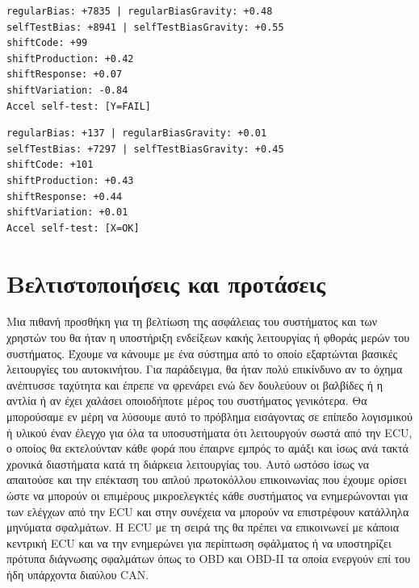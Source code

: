 \documentclass{article}
\begin{document}
\begin{lstlisting}[frame=single,caption=Αποτυχημένο self-test για τον Y άξονα,label=code1]
regularBias: +7835 | regularBiasGravity: +0.48
selfTestBias: +8941 | selfTestBiasGravity: +0.55
shiftCode: +99 
shiftProduction: +0.42
shiftResponse: +0.07
shiftVariation: -0.84
Accel self-test: [Y=FAIL]
\end{lstlisting}

\begin{lstlisting}[frame=single,caption=Επιτυχημένο self-test για τον X άξονα,label=code2]
regularBias: +137 | regularBiasGravity: +0.01
selfTestBias: +7297 | selfTestBiasGravity: +0.45
shiftCode: +101
shiftProduction: +0.43
shiftResponse: +0.44
shiftVariation: +0.01
Accel self-test: [X=OK]
\end{lstlisting}

\section{Βελτιστοποιήσεις και προτάσεις}

Μια πιθανή προσθήκη για τη βελτίωση της ασφάλειας του συστήματος και των χρηστών του θα ήταν η υποστήριξη ενδείξεων κακής λειτουργίας ή φθοράς μερών του συστήματος. Έχουμε να κάνουμε με ένα σύστημα από το οποίο εξαρτώνται βασικές λειτουργίες του αυτοκινήτου. Για παράδειγμα, θα ήταν πολύ επικίνδυνο αν το όχημα ανέπτυσσε ταχύτητα και έπρεπε να φρενάρει ενώ δεν δουλεύουν οι βαλβίδες ή η αντλία ή αν έχει χαλάσει οποιοδήποτε μέρος του συστήματος γενικότερα. Θα μπορούσαμε εν μέρη να λύσουμε αυτό το πρόβλημα εισάγοντας σε επίπεδο λογισμικού ή υλικού έναν έλεγχο για όλα τα υποσυστήματα ότι λειτουργούν σωστά από την ECU, ο οποίος θα εκτελούνταν κάθε φορά που έπαιρνε εμπρός το αμάξι και ίσως ανά τακτά χρονικά διαστήματα κατά τη διάρκεια λειτουργίας του. Αυτό ωστόσο ίσως να απαιτούσε και την επέκταση του απλού πρωτοκόλλου επικοινωνίας που έχουμε ορίσει ώστε να μπορούν οι επιμέρους μικροελεγκτές κάθε συστήματος να ενημερώνονται για των ελέγχων από την ECU και στην συνέχεια να μπορούν να επιστρέφουν κατάλληλα μηνύματα σφαλμάτων. Η ECU με τη σειρά της θα πρέπει να επικοινωνεί με κάποια κεντρική ECU και να την ενημερώνει για περίπτωση σφάλματος ή να υποστηρίζει πρότυπα διάγνωσης σφαλμάτων όπως το OBD και OBD-II τα οποία ενεργούν επί του ήδη υπάρχοντα διαύλου CAN.
\end{document}
